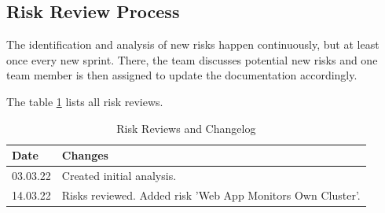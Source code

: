 \subsection{Risk Review Process}
The identification and analysis of new risks happen continuously, but at least once every new sprint. There, the team discusses potential new risks and one team member is then assigned to update the documentation accordingly.

The table \ref{tab:risk-review} lists all risk reviews.

\begin{table}[h!]
\centering
  \caption{\label{tab:risk-review}Risk Reviews and Changelog}
  \begin{tabular}{ | l | l | }
    \hline
    \textbf{Date} & \textbf{Changes} \\
    \hline
    03.03.22 & Created initial analysis. \\
    \hline
    14.03.22 & Risks reviewed. Added risk 'Web App Monitors Own Cluster'. \\
    \hline
  \end{tabular}
\end{table}



